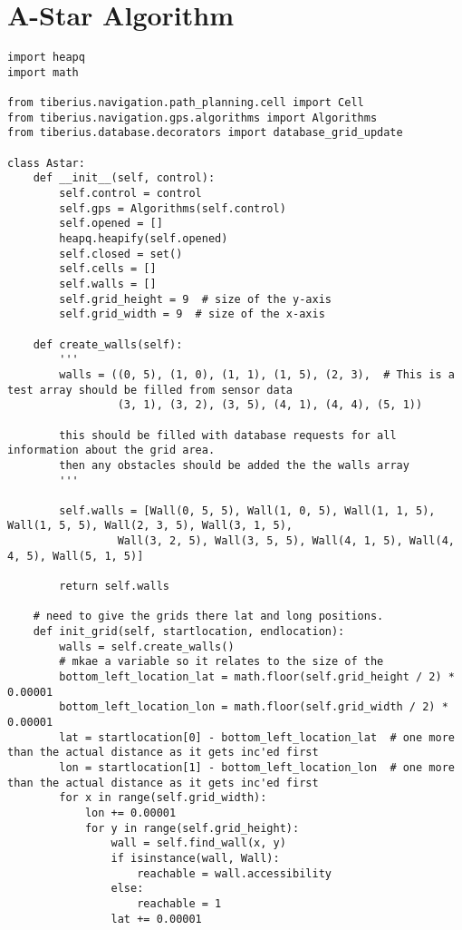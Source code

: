 \chapter{A-Star Algorithm}
\label{app:Astar}
\pagestyle{stuart}

\begin{lstlisting}[style=custompython, label=astar-code, caption=A-Star algorithm class code]
import heapq
import math

from tiberius.navigation.path_planning.cell import Cell
from tiberius.navigation.gps.algorithms import Algorithms
from tiberius.database.decorators import database_grid_update

class Astar:
    def __init__(self, control):
        self.control = control
        self.gps = Algorithms(self.control)
        self.opened = []
        heapq.heapify(self.opened)
        self.closed = set()
        self.cells = []
        self.walls = []
        self.grid_height = 9  # size of the y-axis
        self.grid_width = 9  # size of the x-axis

    def create_walls(self):
        '''
        walls = ((0, 5), (1, 0), (1, 1), (1, 5), (2, 3),  # This is a test array should be filled from sensor data
                 (3, 1), (3, 2), (3, 5), (4, 1), (4, 4), (5, 1))

        this should be filled with database requests for all information about the grid area.
        then any obstacles should be added the the walls array
        '''

        self.walls = [Wall(0, 5, 5), Wall(1, 0, 5), Wall(1, 1, 5), Wall(1, 5, 5), Wall(2, 3, 5), Wall(3, 1, 5),
                 Wall(3, 2, 5), Wall(3, 5, 5), Wall(4, 1, 5), Wall(4, 4, 5), Wall(5, 1, 5)]

        return self.walls

    # need to give the grids there lat and long positions.
    def init_grid(self, startlocation, endlocation):
        walls = self.create_walls()
        # mkae a variable so it relates to the size of the
        bottom_left_location_lat = math.floor(self.grid_height / 2) * 0.00001
        bottom_left_location_lon = math.floor(self.grid_width / 2) * 0.00001
        lat = startlocation[0] - bottom_left_location_lat  # one more than the actual distance as it gets inc'ed first
        lon = startlocation[1] - bottom_left_location_lon  # one more than the actual distance as it gets inc'ed first
        for x in range(self.grid_width):
            lon += 0.00001
            for y in range(self.grid_height):
                wall = self.find_wall(x, y)
                if isinstance(wall, Wall):
                    reachable = wall.accessibility
                else:
                    reachable = 1
                lat += 0.00001


\end{lstlisting}

